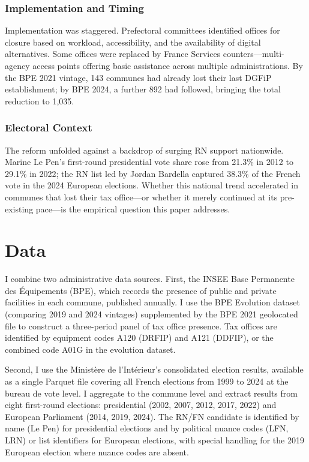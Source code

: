 \documentclass[12pt]{article}
\begin{document}
\subsubsection*{Implementation and Timing} Implementation was staggered. Prefectoral committees identified offices for closure based on workload, accessibility, and the availability of digital alternatives. Some offices were replaced by France Services counters---multi-agency access points offering basic assistance across multiple administrations. By the BPE 2021 vintage, 143 communes had already lost their last DGFiP establishment; by BPE 2024, a further 892 had followed, bringing the total reduction to 1,035.

\subsubsection*{Electoral Context} The reform unfolded against a backdrop of surging RN support nationwide. Marine Le Pen's first-round presidential vote share rose from 21.3\% in 2012 to 29.1\% in 2022; the RN list led by Jordan Bardella captured 38.3\% of the French vote in the 2024 European elections. Whether this national trend accelerated in communes that lost their tax office---or whether it merely continued at its pre-existing pace---is the empirical question this paper addresses.

\section{Data}

I combine two administrative data sources. First, the INSEE Base Permanente des \'{E}quipements (BPE), which records the presence of public and private facilities in each commune, published annually. I use the BPE Evolution dataset (comparing 2019 and 2024 vintages) supplemented by the BPE 2021 geolocated file to construct a three-period panel of tax office presence. Tax offices are identified by equipment codes A120 (DRFIP) and A121 (DDFIP), or the combined code A01G in the evolution dataset.

Second, I use the Minist\`{e}re de l'Int\'{e}rieur's consolidated election results, available as a single Parquet file covering all French elections from 1999 to 2024 at the bureau de vote level. I aggregate to the commune level and extract results from eight first-round elections: presidential (2002, 2007, 2012, 2017, 2022) and European Parliament (2014, 2019, 2024). The RN/FN candidate is identified by name (Le Pen) for presidential elections and by political nuance codes (LFN, LRN) or list identifiers for European elections, with special handling for the 2019 European election where nuance codes are absent.
\end{document}
